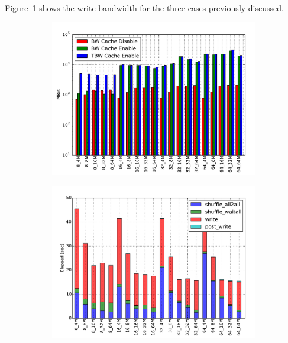 Figure~\ref{figure: collperf-bw} shows the write bandwidth for the three cases previously discussed.
\begin{figure}[!htb]
  \begin{subfigure}[t]{0.51\textwidth}
  \centering
  \includegraphics[width=\textwidth]{chapters/chapter3/figures/coll_perf_32GB_30sec_bw}
  \caption{}
  \label{figure: collperf-bw}
  \end{subfigure}
  \begin{subfigure}[t]{0.51\textwidth}
  \centering
  \includegraphics[width=\textwidth]{chapters/chapter3/figures/coll_perf_32GB_30sec_elapsed_disable}
  \caption{}
  \label{figure: collperf-elaps-disable}
  \end{subfigure}

\end{figure}
